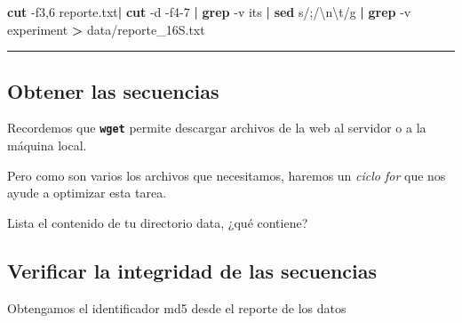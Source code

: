 \documentclass[
]{book}
\newenvironment{Shaded}{\begin{snugshade}}{\end{snugshade}}
\newcommand{\AttributeTok}[1]{\textcolor[rgb]{0.13,0.29,0.53}{#1}}
\newcommand{\ControlFlowTok}[1]{\textcolor[rgb]{0.13,0.29,0.53}{\textbf{#1}}}
\newcommand{\FunctionTok}[1]{\textcolor[rgb]{0.13,0.29,0.53}{\textbf{#1}}}
\newcommand{\KeywordTok}[1]{\textcolor[rgb]{0.13,0.29,0.53}{\textbf{#1}}}
\newcommand{\NormalTok}[1]{#1}
\newcommand{\OperatorTok}[1]{\textcolor[rgb]{0.81,0.36,0.00}{\textbf{#1}}}
\newcommand{\StringTok}[1]{\textcolor[rgb]{0.31,0.60,0.02}{#1}}
\newcommand{\VariableTok}[1]{\textcolor[rgb]{0.00,0.00,0.00}{#1}}
\begin{document}
\begin{Shaded}
\begin{Highlighting}[]
\FunctionTok{cut} \AttributeTok{{-}f3,6}\NormalTok{ reporte.txt}\KeywordTok{|} \FunctionTok{cut} \AttributeTok{{-}d}\StringTok{\textquotesingle{} \textquotesingle{}} \AttributeTok{{-}f4{-}7} \KeywordTok{|} \FunctionTok{grep} \AttributeTok{{-}v} \StringTok{\textquotesingle{}its\textquotesingle{}} \KeywordTok{|} \FunctionTok{sed} \StringTok{\textquotesingle{}s/;/\textbackslash{}n\textbackslash{}t/g\textquotesingle{}} \KeywordTok{|} \FunctionTok{grep} \AttributeTok{{-}v} \StringTok{\textquotesingle{}experiment\textquotesingle{}} \OperatorTok{\textgreater{}}\NormalTok{ data/reporte\_16S.txt}
\end{Highlighting}
\end{Shaded}

\begin{center}\rule{0.5\linewidth}{0.5pt}\end{center}

\subsection{Obtener las secuencias}\label{obtener-las-secuencias}

Recordemos que \textbf{\texttt{wget}} permite descargar archivos de la web al servidor o a la máquina local.

Pero como son varios los archivos que necesitamos, haremos un \emph{ciclo for} que nos ayude a optimizar esta tarea.

\begin{Shaded}
\end{Shaded}

Lista el contenido de tu directorio data, ¿qué contiene?

\subsection{Verificar la integridad de las secuencias}\label{verificar-la-integridad-de-las-secuencias}

Obtengamos el identificador md5 desde el reporte de los datos
\end{document}
